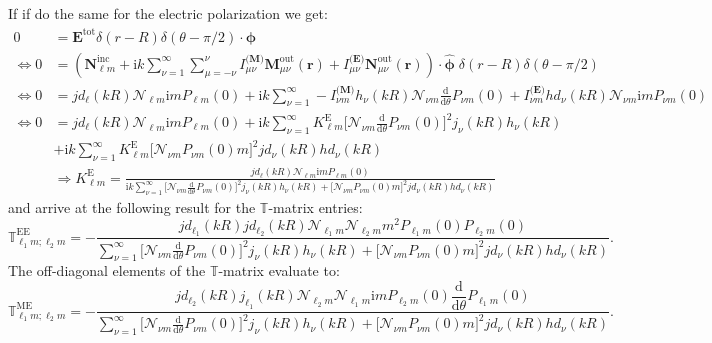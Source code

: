 \documentclass[a4paper,12pt]{scrartcl}  %
\newcommand{\unitv}[1]{\hat{\bm{#1}}}
\newcommand{\imag}{\mathrm{i}}
\newcommand{\rd}{\mathrm{d}}
\begin{document}
If if do the same for the electric polarization we get:
\begin{align}
0&=\mathbf{E}^\mathrm{tot}\delta(r-R)\delta(\theta-\pi/2)\cdot \unitv{\phi} \\
\nonumber
\Leftrightarrow 0&=\left(\mathbf{N}^\mathrm{inc}_{\ell m} + \imag k \sum_{\nu=1}^\infty  \sum_{\mu=-\nu}^\nu
I_{\mu \nu}^\textbf{(M)}\mathbf{M}^\mathrm{out}_{\mu \nu}(\mathbf{r})+
I_{\mu \nu}^\textbf{(E)}\mathbf{N}^\mathrm{out}_{\mu \nu}(\mathbf{r})\right) \cdot \unitv{\phi}
\;\delta(r-R)\delta(\theta-\pi/2)\\
\nonumber
\Leftrightarrow 0&=
jd_\ell(kR)\mathcal{N}_{\ell m}\imag m P_{\ell m}(0) 
+
\imag k \sum_{\nu=1}^\infty  
-I_{\nu m}^\textbf{(M)}
h_\nu(kR)\mathcal{N}_{\nu m}\frac{\rd}{\rd\theta}P_{\nu m}(0) 
+
I_{\nu m}^\textbf{(E)}
hd_\nu(kR)\mathcal{N}_{\nu m}\imag m  P_{\nu m}(0) \\ \nonumber
\Leftrightarrow
0 &= jd_\ell(kR)\mathcal{N}_{\ell m}\imag m P_{\ell m}(0) 
+ \imag k\sum_{\nu = 1}^\infty
K^\mathrm{E}_{\ell m}\Big[
\mathcal{N}_{\nu m} \frac{\rd}{\rd \theta}P_{\nu m}(0)
\Big]^2 j_\nu(kR) h_\nu(kR)
\\ \nonumber
&+ \imag k\sum_{\nu = 1}^\infty
K^\mathrm{E}_{\ell m} \Big[
\mathcal{N}_{\nu m} P_{\nu m}(0) m
\Big]^2jd_\nu(kR) hd_\nu(kR)
\\ \nonumber
&\Rightarrow K^\mathrm{E}_{\ell m} = \frac{jd_\ell(kR) \mathcal{N}_{\ell m}\imag mP_{\ell m}(0)}{\imag k \displaystyle \sum_{\nu=1}^\infty
\Big[
\mathcal{N}_{\nu m} \frac{\rd}{\rd \theta}P_{\nu m}(0)
\Big]^2 j_\nu(kR) h_\nu(kR)
+
\Big[
\mathcal{N}_{\nu m} P_{\nu m}(0) m
\Big]^2jd_\nu(kR) hd_\nu(kR)
}
\end{align}
and arrive at the following result for the $\mathbb{T}$-matrix entries:
\begin{equation}
\mathbb{T}^\mathrm{EE}_{\ell_1 m;\ell_2 m} = -
\frac{jd_{\ell_1}(kR)jd_{\ell_2}(kR) 
\mathcal{N}_{\ell_1 m}\mathcal{N}_{\ell_2 m}
m^2P_{\ell_1 m}(0)P_{\ell_2 m}(0)}{\displaystyle \sum_{\nu=1}^\infty
\Big[
\mathcal{N}_{\nu m} \frac{\rd}{\rd \theta}P_{\nu m}(0)
\Big]^2 j_\nu(kR) h_\nu(kR)
+
\Big[
\mathcal{N}_{\nu m} P_{\nu m}(0) m
\Big]^2jd_\nu(kR) hd_\nu(kR)
}.
\end{equation}
The off-diagonal elements of the $\mathbb{T}$-matrix evaluate to:
\begin{equation}
\mathbb{T}^\mathrm{ME}_{\ell_1 m;\ell_2 m} = -
\frac{jd_{\ell_2}(kR) j_{\ell_1}(kR)
\mathcal{N}_{\ell_2 m}\mathcal{N}_{\ell_1 m}
\imag mP_{\ell_2 m}(0)\dfrac{\rd}{\rd \theta}P_{\ell_1 m}(0)
}{\displaystyle \sum_{\nu=1}^\infty
\Big[
\mathcal{N}_{\nu m} \frac{\rd}{\rd \theta}P_{\nu m}(0)
\Big]^2 j_\nu(kR) h_\nu(kR)
+
\Big[
\mathcal{N}_{\nu m} P_{\nu m}(0) m
\Big]^2jd_\nu(kR) hd_\nu(kR)
}.
\end{equation}
\end{document}

